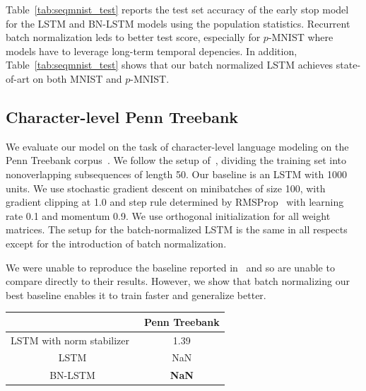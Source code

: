 \documentclass{article} %
\begin{document}
Table~\ref{tab:seqmnist_test} reports the test set accuracy of the early stop model for the LSTM and BN-LSTM models using the population statistics. Recurrent batch normalization leds to better test score, especially for $p$-MNIST  where models have to leverage long-term temporal depencies. In addition, Table~\ref{tab:seqmnist_test} shows that our batch normalized LSTM achieves state-of-art on both MNIST and $p$-MNIST.

\subsection{Character-level Penn Treebank}

We evaluate our model on the task of character-level language modeling on the Penn Treebank corpus~\cite{penntreebank}.
We follow the setup of~\cite{krueger}, dividing the training set into nonoverlapping subsequences of length 50.
Our baseline is an LSTM with 1000 units.
We use stochastic gradient descent on minibatches of size 100,
with gradient clipping at 1.0 and step rule determined by RMSProp~\cite{rmsprop}
with learning rate 0.1 and momentum 0.9.
We use orthogonal initialization for all weight matrices.
The setup for the batch-normalized LSTM is the same in all respects except for the introduction of batch normalization.

We were unable to reproduce the baseline reported in~\cite{krueger} and so are unable to compare directly to their results.
However, we show that batch normalizing our best baseline enables it to train faster and generalize better.

%

\begin{tabular}{c|c}
  & Penn Treebank \\
  \hline
  LSTM with norm stabilizer~\cite{krueger} & 1.39 \\
  \hline
  LSTM & NaN \\
  BN-LSTM & \textbf{NaN} \\
\end{tabular}
\end{document}
